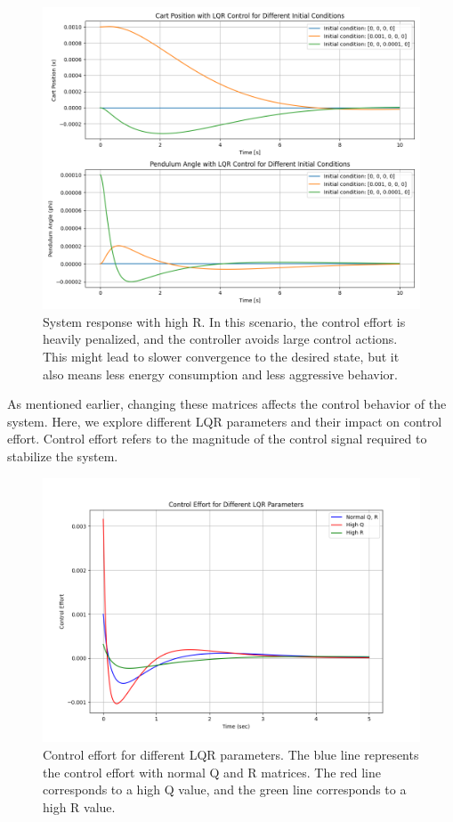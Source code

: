 \documentclass[11pt,twocolumn,twoside,lineno]{pnas-new}
\begin{document}
\begin{figure}[ht]
    \centering
    \includegraphics[width=\linewidth]{simulations/high_r_rate.png}
    \caption{System response with high R. In this scenario, the control effort is heavily penalized, and the controller avoids large control actions. This might lead to slower convergence to the desired state, but it also means less energy consumption and less aggressive behavior.}
    \label{fig:high_r}
\end{figure}

As mentioned earlier, changing these matrices affects the control behavior of the system. Here, we explore different LQR parameters and their impact on control effort. Control effort refers to the magnitude of the control signal required to stabilize the system.

\begin{figure}[ht]
    \centering
    \includegraphics[width=\linewidth]{simulations/control_effort.png}
    \caption{Control effort for different LQR parameters. The blue line represents the control effort with normal Q and R matrices. The red line corresponds to a high Q value, and the green line corresponds to a high R value.}
    \label{fig:control_effort}
\end{figure}
\end{document}
